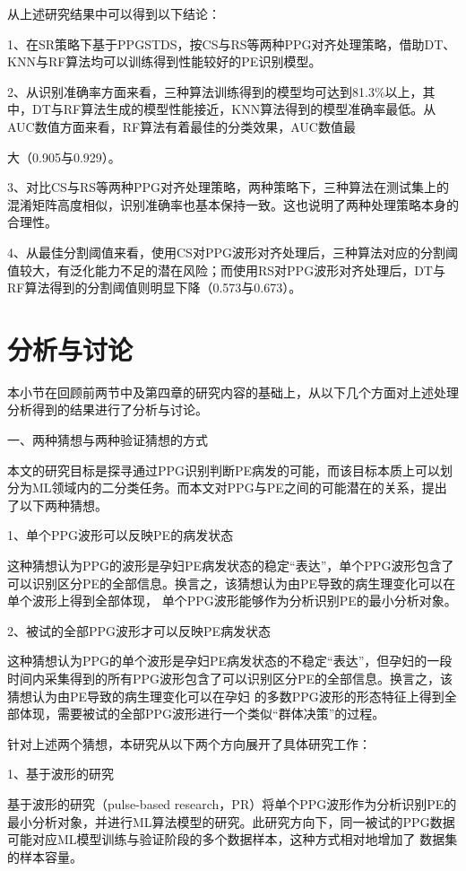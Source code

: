 从上述研究结果中可以得到以下结论：

1、在SR策略下基于PPGSTDS，按CS与RS等两种PPG对齐处理策略，借助DT、KNN与RF算法均可以训练得到性能较好的PE识别模型。

2、从识别准确率方面来看，三种算法训练得到的模型均可达到81.3\%以上，其中，DT与RF算法生成的模型性能接近，KNN算法得到的模型准确率最低。从AUC数值方面来看，RF算法有着最佳的分类效果，AUC数值最

\clearpage

\noindent
大（0.905与0.929）。

3、对比CS与RS等两种PPG对齐处理策略，两种策略下，三种算法在测试集上的混淆矩阵高度相似，识别准确率也基本保持一致。这也说明了两种处理策略本身的合理性。

4、从最佳分割阈值来看，使用CS对PPG波形对齐处理后，三种算法对应的分割阈值较大，有泛化能力不足的潜在风险；而使用RS对PPG波形对齐处理后，DT与RF算法得到的分割阈值则明显下降（0.573与0.673）。

\section{分析与讨论}
本小节在回顾前两节中及第四章的研究内容的基础上，从以下几个方面对上述处理分析得到的结果进行了分析与讨论。

一、两种猜想与两种验证猜想的方式

本文的研究目标是探寻通过PPG识别判断PE病发的可能，而该目标本质上可以划分为ML领域内的二分类任务。而本文对PPG与PE之间的可能潜在的关系，提出了以下两种猜想。

1、单个PPG波形可以反映PE的病发状态

这种猜想认为PPG的波形是孕妇PE病发状态的稳定“表达”，单个PPG波形包含了可以识别区分PE的全部信息。换言之，该猜想认为由PE导致的病生理变化可以在单个波形上得到全部体现，
单个PPG波形能够作为分析识别PE的最小分析对象。

2、被试的全部PPG波形才可以反映PE病发状态

这种猜想认为PPG的单个波形是孕妇PE病发状态的不稳定“表达”，但孕妇的一段时间内采集得到的所有PPG波形包含了可以识别区分PE的全部信息。换言之，该猜想认为由PE导致的病生理变化可以在孕妇
的多数PPG波形的形态特征上得到全部体现，需要被试的全部PPG波形进行一个类似“群体决策”的过程。

针对上述两个猜想，本研究从以下两个方向展开了具体研究工作：

1、基于波形的研究

基于波形的研究（pulse-based research，PR）将单个PPG波形作为分析识别PE的最小分析对象，并进行ML算法模型的研究。此研究方向下，同一被试的PPG数据可能对应ML模型训练与验证阶段的多个数据样本，这种方式相对地增加了
数据集的样本容量。


